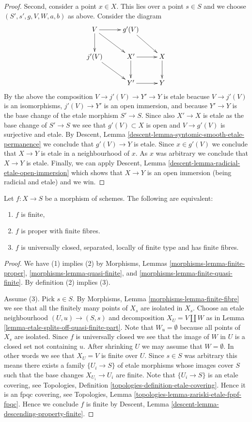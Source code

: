 \begin{proof}
\medskip\noindent
Second, consider a point $x \in X$. This lies over a point $s \in S$
and we choose $(S', s', g, V, W, a, b)$ as above. Consider the diagram
$$
\xymatrix{
V \ar[r] \ar[d] \ar[rd] &
g'(V) \ar[rd] \\
j'(V) \ar[rd] &
X' \ar[d] \ar[r] &
X \ar[d] \\
 & Y' \ar[r] & Y
}
$$
By the above the composition $V \to j'(V) \to Y' \to Y$ is etale
beacuse $V \to j'(V)$ is an isomorphisms, $j'(V) \to Y'$ is
an open immersion, and because $Y' \to Y$ is the base change
of the etale morphism $S' \to S$.
Since also $X' \to X$ is etale as the base change of
$S' \to S$ we see that $g'(V) \subset X$ is open
and $V \to g'(V)$ is surjective and etale. By
Descent, Lemma \ref{descent-lemma-syntomic-smooth-etale-permanence}
we conclude that $g'(V) \to Y$ is etale.
Since $x \in g'(V)$ we conclude that $X \to Y$ is etale in a neighbourhood
of $x$. As $x$ was arbitrary we conclude that $X \to Y$ is etale.
Finally, we can apply
Descent, Lemma \ref{descent-lemma-radicial-etale-open-immersion}
which shows that $X \to Y$
is an open immersion (being radicial and etale) and we win.
\end{proof}

\begin{lemma}
\label{lemma-characterize-finite}
Let $f : X \to S$ be a morphism of schemes.
The following are equivalent:
\begin{enumerate}
\item $f$ is finite,
\item $f$ is proper with finite fibres.
\item $f$ is universally closed, separated, locally of finite type
and has finite fibres.
\end{enumerate}
\end{lemma}

\begin{proof}
We have (1) implies (2) by
Morphisms, Lemmas \ref{morphisms-lemma-finite-proper},
\ref{morphisms-lemma-quasi-finite},
and \ref{morphisms-lemma-finite-quasi-finite}.
By definition (2) implies (3).

\medskip\noindent
Assume (3). Pick $s \in S$. By
Morphisms, Lemma \ref{morphisms-lemma-finite-fibre} we
see that all the finitely many points of $X_s$ are isolated in $X_s$.
Choose an etale neighbourhood $(U, u) \to (S, s)$
and decomposition $X_U = V \coprod W$ as in
Lemma \ref{lemma-etale-splits-off-quasi-finite-part}.
Note that $W_u = \emptyset$ because all points of $X_s$ are isolated.
Since $f$ is universally closed we see that
the image of $W$ in $U$ is a closed set not containing $u$.
After shrinking $U$ we may assume that $W = \emptyset$.
In other words we see that $X_U = V$ is finite over $U$.
Since $s \in S$ was arbitrary
this means there exists a family $\{U_i \to S\}$
of etale morphisms whose images cover $S$ such that
the base changes $X_{U_i} \to U_i$ are finite.
Note that $\{U_i \to S\}$ is an etale covering,
see Topologies, Definition \ref{topologies-definition-etale-covering}.
Hence it is an fpqc covering, see
Topologies, Lemma \ref{topologies-lemma-zariski-etale-fppf-fpqc}.
Hence we conclude $f$ is finite by
Descent, Lemma \ref{descent-lemma-descending-property-finite}.
\end{proof}

